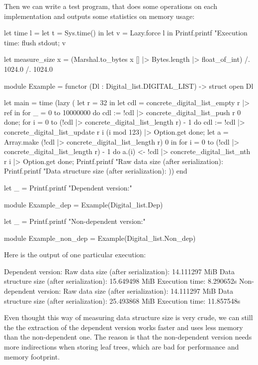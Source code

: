 \documentclass{article}
\begin{document}
Then we can write a test program, that does some operations on each implementation and outputs some statistics on memory usage:

\begin{coq}
let time l =
  let t = Sys.time() in
  let v = Lazy.force l in
  Printf.printf "Execution time: %
  flush stdout;
  v

let measure_size x = (Marshal.to_bytes x [] |> Bytes.length |> float_of_int) /. 1024.0 /. 1024.0

module Example = functor (Dl : Digital_list.DIGITAL_LIST) -> struct
  open Dl

  let main =
    time (lazy (
      let r = 32 in
      let cdl = concrete_digital_list_empty r |> ref in
      for _ = 0 to 10000000 do
        cdl := !cdl |> concrete_digital_list_push r 0
      done;
      for i = 0 to (!cdl |> concrete_digital_list_length r) - 1 do
        cdl := !cdl |> concrete_digital_list_update r i (i mod 123) |> Option.get
      done;
      let a = Array.make (!cdl |> concrete_digital_list_length r) 0 in
      for i = 0 to (!cdl |> concrete_digital_list_length r) - 1 do
        a.(i) <- !cdl |> concrete_digital_list_nth r i |> Option.get
      done;
      Printf.printf "Raw data size (after serialization): %
      Printf.printf "Data structure size (after serialization): %
    ))
end

let _ = Printf.printf "Dependent version:\n"

module Example_dep = Example(Digital_list.Dep)

let _ = Printf.printf "Non-dependent version:\n"

module Example_non_dep = Example(Digital_list.Non_dep)
\end{coq}

Here is the output of one particular execution:

\begin{coq}
Dependent version:
Raw data size (after serialization): 14.111297 MiB
Data structure size (after serialization): 15.649498 MiB
Execution time: 8.290652s
Non-dependent version:
Raw data size (after serialization): 14.111297 MiB
Data structure size (after serialization): 25.493868 MiB
Execution time: 11.857548s
\end{coq}

Even thought this way of measuring data structure size is very crude, we can still the the extraction of the dependent version works faster and uses less memory than the non-dependent one. The reason is that the non-dependent version needs more indirections when storing leaf trees, which are bad for performance and memory footprint.
\end{document}
